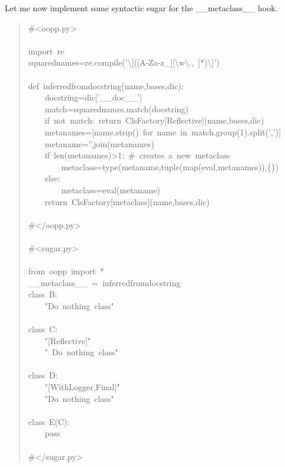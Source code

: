 \documentclass[10pt,english]{article}
\begin{document}
Let me now implement some syntactic sugar for the {\_}{\_}metaclass{\_}{\_} hook.
\begin{quote}
\begin{ttfamily}\begin{flushleft}
\mbox{{\#}<oopp.py>}\\
\mbox{}\\
\mbox{import~re}\\
\mbox{squarednames=re.compile('{\textbackslash}[([A-Za-z{\_}][{\textbackslash}w{\textbackslash}.,~]*){\textbackslash}]')}\\
\mbox{}\\
\mbox{def~inferredfromdocstring(name,bases,dic):}\\
\mbox{~~~~docstring=dic['{\_}{\_}doc{\_}{\_}']}\\
\mbox{~~~~match=squarednames.match(docstring)}\\
\mbox{~~~~if~not~match:~return~ClsFactory[Reflective](name,bases,dic)}\\
\mbox{~~~~metanames=[name.strip()~for~name~in~match.group(1).split(',')]}\\
\mbox{~~~~metaname=''.join(metanames)~~}\\
\mbox{~~~~if~len(metanames)>1:~{\#}~creates~a~new~metaclass}\\
\mbox{~~~~~~~~metaclass=type(metaname,tuple(map(eval,metanames)),{\{}{\}})}\\
\mbox{~~~~else:}\\
\mbox{~~~~~~~~metaclass=eval(metaname)}\\
\mbox{~~~~return~ClsFactory[metaclass](name,bases,dic)}\\
\mbox{}\\
\mbox{{\#}</oopp.py>}\\
\mbox{}\\
\mbox{{\#}<sugar.py>}\\
\mbox{}\\
\mbox{from~oopp~import~*}\\
\mbox{{\_}{\_}metaclass{\_}{\_}~=~inferredfromdocstring}\\
\mbox{class~B:}\\
\mbox{~~~~"Do~nothing~class"}\\
\mbox{}\\
\mbox{class~C:~}\\
\mbox{~~~~"[Reflective]"}\\
\mbox{~~~~"~Do~nothing~class"}\\
\mbox{}\\
\mbox{class~D:}\\
\mbox{~~~~"[WithLogger,Final]"}\\
\mbox{~~~~"Do~nothing~class"}\\
\mbox{}\\
\mbox{class~E(C):}\\
\mbox{~~~~pass}\\
\mbox{}\\
\mbox{{\#}</sugar.py>}
\end{flushleft}\end{ttfamily}
\end{quote}
\end{document}
